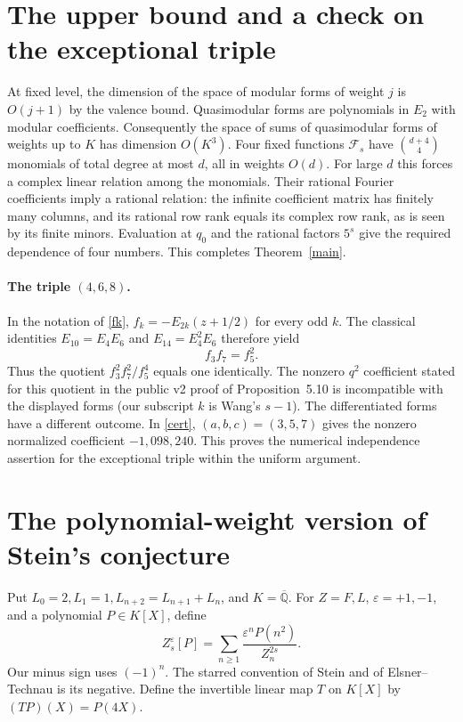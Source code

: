 \documentclass[11pt]{article}
\newcommand{\QQ}{\mathbb Q}
\newcommand{\F}{\mathcal F}
\begin{document}
\section{The upper bound and a check on the exceptional triple}
At fixed level, the dimension of the space of modular forms of weight $j$ is $O(j+1)$ by the valence bound. Quasimodular forms are polynomials in $E_2$ with modular coefficients. Consequently the space of sums of quasimodular forms of weights up to $K$ has dimension $O(K^3)$. Four fixed functions $\F_s$ have $\binom{d+4}{4}$ monomials of total degree at most $d$, all in weights $O(d)$. For large $d$ this forces a complex linear relation among the monomials. Their rational Fourier coefficients imply a rational relation: the infinite coefficient matrix has finitely many columns, and its rational row rank equals its complex row rank, as is seen by its finite minors. Evaluation at $q_0$ and the rational factors $5^s$ give the required dependence of four numbers. This completes Theorem~\ref{main}.

\paragraph{The triple $(4,6,8)$.}
In the notation of \eqref{fk}, $f_k=-E_{2k}(z+1/2)$ for every odd $k$. The classical identities $E_{10}=E_4E_6$ and $E_{14}=E_4^2E_6$ therefore yield
\[
 f_3 f_7=f_5^2.
\]
Thus the quotient $f_3^2f_7^2/f_5^4$ equals one identically. The nonzero $q^2$ coefficient stated for this quotient in the public v2 proof of Proposition~5.10 is incompatible with the displayed forms (our subscript $k$ is Wang's $s-1$). The differentiated forms have a different outcome. In \eqref{cert}, $(a,b,c)=(3,5,7)$ gives the nonzero normalized coefficient $-1{,}098{,}240$. This proves the numerical independence assertion for the exceptional triple within the uniform argument.

\clearpage
\section{The polynomial-weight version of Stein's conjecture}\label{stein}
Put $L_0=2,L_1=1,L_{n+2}=L_{n+1}+L_n$, and $K=\overline{\QQ}$. For $Z=F,L$, $\varepsilon=+1,-1$, and a polynomial $P\in K[X]$, define
\[
 Z_s^\varepsilon[P]=\sum_{n\ge1}\frac{\varepsilon^n P(n^2)}{Z_n^{2s}}.
\]
Our minus sign uses $(-1)^n$. The starred convention of Stein and of Elsner--Technau is its negative. Define the invertible linear map $T$ on $K[X]$ by $(TP)(X)=P(4X)$.
\end{document}
